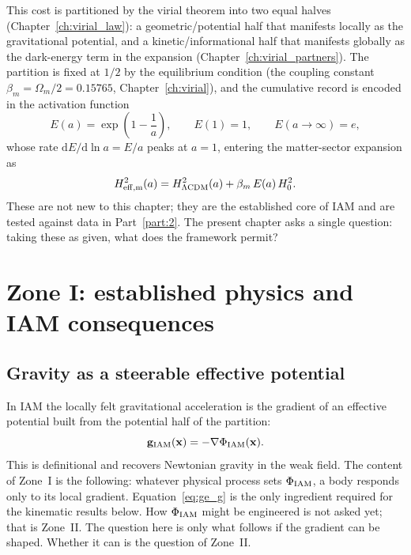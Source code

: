 This cost is partitioned by the virial theorem into two equal halves (Chapter~\ref{ch:virial_law}): a geometric/potential half that manifests locally
as the gravitational potential, and a kinetic/informational half that manifests globally as the dark-energy term in the expansion
(Chapter~\ref{ch:virial_partners}). \interp{} The partition is fixed at $1/2$ by the equilibrium condition (the coupling constant
$\beta_m=\Omega_m/2=0.15765$, Chapter~\ref{ch:virial}), \derived{} and the cumulative record is encoded in the activation function
\begin{equation}
E(a)=\exp\!\left(1-\frac1a\right),\qquad E(1)=1,\qquad E(a\to\infty)=e,
\label{eq:ge_Ea}
\end{equation}
whose rate $\mathrm dE/\mathrm d\ln a=E/a$ peaks at $a=1$, \derived{} entering the matter-sector expansion as
\begin{equation}
H^2_{\rm eff,m}(a)=H^2_{\Lambda{\rm CDM}}(a)+\beta_m\,E(a)\,H_0^2 .
\label{eq:ge_Hm}
\end{equation}
These are not new to this chapter; they are the established core of IAM and are tested against data in Part~\ref{part:2}. The present chapter asks a
single question: taking these as given, what does the framework permit?

\section{Zone I: established physics and IAM consequences}\label{sec:ge_zone1}

\subsection{Gravity as a steerable effective potential}
In IAM the locally felt gravitational acceleration is the gradient of an effective potential built from the potential half of the partition:
\begin{equation}
\mathbf g_{\rm IAM}(\mathbf x)=-\nabla\Phi_{\rm IAM}(\mathbf x).
\label{eq:ge_g}
\end{equation}
This is definitional and recovers Newtonian gravity in the weak field. \derived{} The content of Zone~I is the following: whatever physical process
sets $\Phi_{\rm IAM}$, a body responds only to its local gradient. Equation~\eqref{eq:ge_g} is the only ingredient required for the kinematic results
below. How $\Phi_{\rm IAM}$ might be engineered is not asked yet; that is Zone~II. The question here is only what follows if the gradient can be shaped.
Whether it can is the question of Zone~II.

